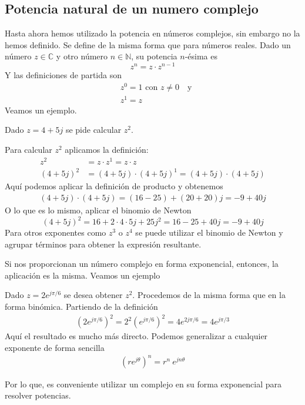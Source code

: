 \subsection{Potencia natural de un numero complejo}

Hasta ahora hemos utilizado la potencia en números complejos, sin embargo no la hemos definido. Se define de la misma forma que para números reales. Dado un número $z\in\mathbb{C}$ y otro número $n\in\mathbb{N}$, su potencia $n$-ésima es
$$
z^n = z \cdot z^{n-1}
$$
Y las definiciones de partida son
\begin{align*}
  &z^0 = 1 \text{ con } z\neq 0 \quad \text{y}\\ &z^1 = z
\end{align*}
Veamos un ejemplo.
\begin{example}
  Dado $z=4+5j$ se pide calcular $z^2$.

  Para calcular $z^2$ aplicamos la definición:
  \begin{align*}
    z^2 &= z \cdot z^1 = z \cdot z \\ 
    (4+5j)^2 &= (4+5j)\cdot (4+5j)^1 = (4+5j)\cdot(4+5j)
  \end{align*}
  Aquí podemos aplicar la definición de producto y obtenemos
  \begin{align*}
    (4+5j)\cdot(4+5j)=(16-25)+(20+20)j=-9+40j
  \end{align*}
  O lo que es lo mismo, aplicar el binomio de Newton
  $$
  (4+5j)^2 = 16 + 2\cdot4\cdot5j + 25j^2 = 16-25 + 40j = -9 + 40j
  $$
  Para otros exponentes como $z^3$ o $z^4$ se puede utilizar el binomio de Newton y agrupar términos para obtener la expresión resultante.
\end{example}

Si nos proporcionan un número complejo en forma exponencial, entonces, la aplicación es la misma. Veamos un ejemplo
\begin{example}
  Dado $z=2e^{j\pi/6}$ se desea obtener $z^2$. Procedemos de la misma forma que en la forma binómica. Partiendo de la definición
  \begin{align*}
    (2e^{j\pi/6})^2 = 2^2 (e^{j\pi/6})^2 = 4 e^{2j\pi/6} = 4 e^{j\pi/3}
  \end{align*}
  Aquí el resultado es mucho más directo. Podemos generalizar a cualquier exponente de forma sencilla
  \begin{align*}
    (re^{j\theta})^n = r^n ~ e^{jn\theta}
  \end{align*}
\end{example}
Por lo que, es conveniente utilizar un complejo en su forma exponencial para resolver potencias.

